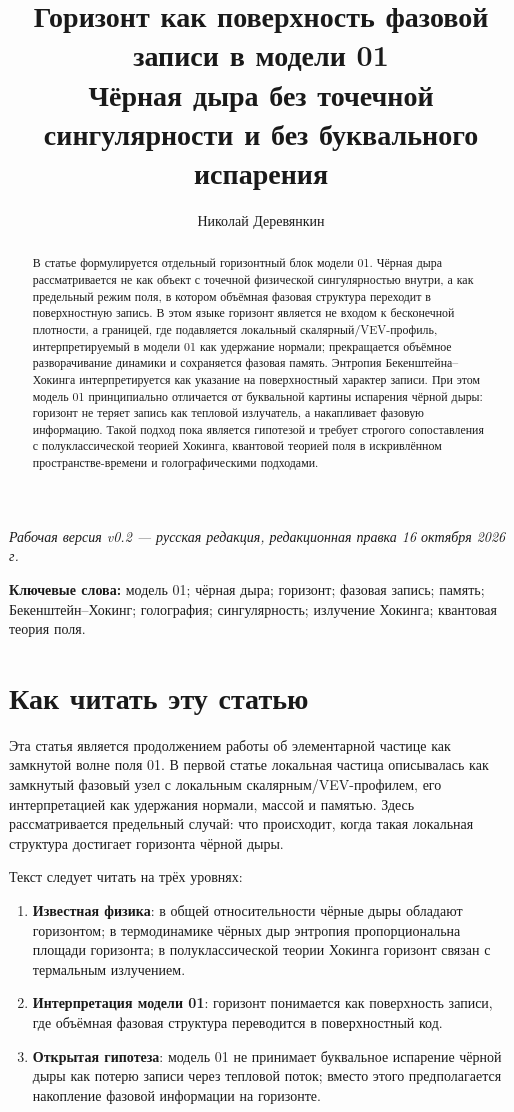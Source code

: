 \documentclass[11pt,a4paper]{article}
\title{Горизонт как поверхность фазовой записи в модели 01\\\large Чёрная дыра без точечной сингулярности и без буквального испарения}
\author{Николай Деревянкин}
\date{}
\begin{document}
\maketitle

\begin{center}
\textit{Рабочая версия v0.2 --- русская редакция, редакционная правка 16 октября 2026 г.}
\end{center}

\begin{abstract}
В статье формулируется отдельный горизонтный блок модели 01. Чёрная дыра рассматривается не как объект с точечной физической сингулярностью внутри, а как предельный режим поля, в котором объёмная фазовая структура переходит в поверхностную запись. В этом языке горизонт является не входом к бесконечной плотности, а границей, где подавляется локальный скалярный/VEV-профиль, интерпретируемый в модели 01 как удержание нормали; прекращается объёмное разворачивание динамики и сохраняется фазовая память. Энтропия Бекенштейна--Хокинга интерпретируется как указание на поверхностный характер записи. При этом модель 01 принципиально отличается от буквальной картины испарения чёрной дыры: горизонт не теряет запись как тепловой излучатель, а накапливает фазовую информацию. Такой подход пока является гипотезой и требует строгого сопоставления с полуклассической теорией Хокинга, квантовой теорией поля в искривлённом пространстве-времени и голографическими подходами.
\end{abstract}

\textbf{Ключевые слова:} модель 01; чёрная дыра; горизонт; фазовая запись; память; Бекенштейн--Хокинг; голография; сингулярность; излучение Хокинга; квантовая теория поля.

\section{Как читать эту статью}

Эта статья является продолжением работы об элементарной частице как замкнутой волне поля 01. В первой статье локальная частица описывалась как замкнутый фазовый узел с локальным скалярным/VEV-профилем, его интерпретацией как удержания нормали, массой и памятью. Здесь рассматривается предельный случай: что происходит, когда такая локальная структура достигает горизонта чёрной дыры.

Текст следует читать на трёх уровнях:
\begin{enumerate}
\item \textbf{Известная физика}: в общей относительности чёрные дыры обладают горизонтом; в термодинамике чёрных дыр энтропия пропорциональна площади горизонта; в полуклассической теории Хокинга горизонт связан с термальным излучением.
\item \textbf{Интерпретация модели 01}: горизонт понимается как поверхность записи, где объёмная фазовая структура переводится в поверхностный код.
\item \textbf{Открытая гипотеза}: модель 01 не принимает буквальное испарение чёрной дыры как потерю записи через тепловой поток; вместо этого предполагается накопление фазовой информации на горизонте.
\end{enumerate}
\end{document}
